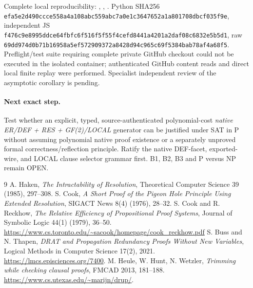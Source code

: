 \documentclass[11pt]{article}
\begin{document}
Complete local reproducibility: , , . Python SHA256 \texttt{efa5e2d490ccce558a4a108abc559abc7a0e1c3647652a1a801708dbcf035f9e}, independent JS \texttt{f476c9e8995ddce64fbfc6f516f5f55f4cefd8441a4201a2daf08c6832e5b5d1}, raw \texttt{69dd974d0b71b16958a5ef572909372a8428d94c965c69f5384bab78af4a68f5}. Preflight/test suite requiring complete private GitHub checkout could not be executed in the isolated container; authenticated GitHub content reads and direct local finite replay were performed. Specialist independent review of the asymptotic corollary is pending.

\paragraph{Next exact step.} Test whether an explicit, typed, source-authenticated polynomial-cost \emph{native ER/DEF + RES + GF(2)/LOCAL} generator can be justified under SAT in P without assuming polynomial native proof existence or a separately unproved formal correctness/reflection principle. Ratify the native DEF-facet, exported-wire, and LOCAL clause selector grammar first. B1, B2, B3 and P versus NP remain OPEN.
\begin{thebibliography}{9}
 A. Haken, \emph{The Intractability of Resolution}, Theoretical Computer Science 39 (1985), 297--308.
 S. Cook, \emph{A Short Proof of the Pigeon Hole Principle Using Extended Resolution}, SIGACT News 8(4) (1976), 28--32.
 S. Cook and R. Reckhow, \emph{The Relative Efficiency of Propositional Proof Systems}, Journal of Symbolic Logic 44(1) (1979), 36--50. \url{https://www.cs.toronto.edu/~sacook/homepage/cook_reckhow.pdf}
 S. Buss and N. Thapen, \emph{DRAT and Propagation Redundancy Proofs Without New Variables}, Logical Methods in Computer Science 17(2), 2021. \url{https://lmcs.episciences.org/7400}.
 M. Heule, W. Hunt, N. Wetzler, \emph{Trimming while checking clausal proofs}, FMCAD 2013, 181--188. \url{https://www.cs.utexas.edu/~marijn/drup/}.
\end{thebibliography}
\end{document}
